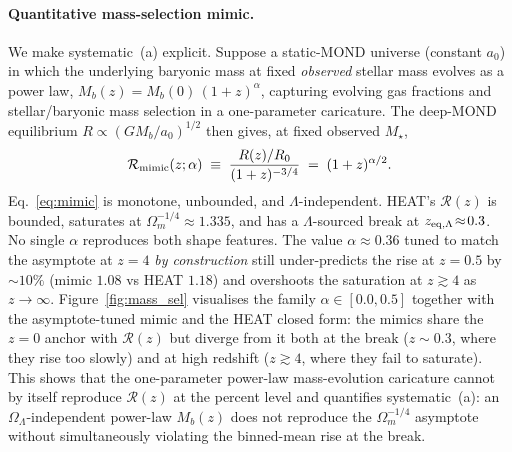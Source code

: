 \documentclass[twocolumn,letterpaper]{aastex631}
\newcommand{\azero}{a_0}
\begin{document}
\paragraph{Quantitative mass-selection mimic.}  We make
systematic~(a) explicit.  Suppose a static-MOND universe (constant
$\azero$) in which the underlying baryonic mass at fixed
\emph{observed} stellar mass evolves as a power law,
$M_{b}(z)=M_{b}(0)\,(1+z)^{\alpha}$, capturing evolving gas
fractions and stellar/baryonic mass selection in a one-parameter
caricature.  The deep-MOND equilibrium
$R\propto(GM_{b}/\azero)^{1/2}$ then gives, at fixed observed
$M_{\star}$,
\begin{equation}\label{eq:mimic}
  \mathcal{R}_{\rm mimic}(z;\alpha)\;\equiv\;
   \frac{R(z)/R_{0}}{(1+z)^{-3/4}}
   \;=\;(1+z)^{\alpha/2}.
\end{equation}
Eq.~\ref{eq:mimic} is monotone, unbounded, and
$\Lambda$-independent.  HEAT's $\mathcal{R}(z)$ is bounded,
saturates at $\Omega_{m}^{-1/4}\!\approx\!1.335$, and has a
$\Lambda$-sourced break at
$z_{\rm eq,\Lambda}\!\approx\!0.3$.  No single $\alpha$
reproduces both shape features.  The value
$\alpha\!\approx\!0.36$ tuned to match the asymptote at
$z\!=\!4$ \emph{by construction} still under-predicts the rise
at $z\!=\!0.5$ by $\sim 10\%$ (mimic $1.08$ vs HEAT $1.18$) and
overshoots the saturation at $z\!\gtrsim\!4$ as $z\to\infty$.
Figure~\ref{fig:mass_sel} visualises the family
$\alpha\!\in\![0.0,0.5]$ together with the asymptote-tuned
mimic and the HEAT closed form: the mimics share the
$z\!=\!0$ anchor with $\mathcal{R}(z)$ but diverge from it
both at the break ($z\!\sim\!0.3$, where they rise too slowly)
and at high redshift ($z\!\gtrsim\!4$, where they fail to
saturate).  This shows that the one-parameter
power-law mass-evolution caricature cannot by itself reproduce
$\mathcal{R}(z)$ at the percent level and quantifies
systematic~(a): an $\Omega_\Lambda$-independent power-law
$M_{b}(z)$ does not reproduce the
$\Omega_{m}^{-1/4}$ asymptote without simultaneously
violating the binned-mean rise at the break.
\end{document}
